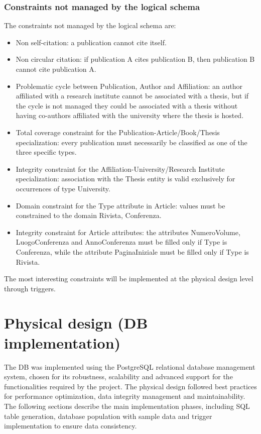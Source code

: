 \documentclass[a4paper,12pt]{article}
\begin{document}
\subsubsection*{Constraints not managed by the logical schema} 
The constraints not managed by the logical schema are:
\begin{itemize}
    \item Non self-citation: a publication cannot cite itself.
    \item Non circular citation: if publication A cites publication B, then publication B cannot cite publication A.
    \item Problematic cycle between Publication, Author and Affiliation: an author affiliated with a research institute cannot be associated with a thesis, but if the cycle is not managed they could be associated with a thesis without having co-authors affiliated with the university where the thesis is hosted.
    \item Total coverage constraint for the Publication-Article/Book/Thesis specialization: every publication must necessarily be classified as one of the three specific types.
    \item Integrity constraint for the Affiliation-University/Research Institute specialization: association with the Thesis entity is valid exclusively for occurrences of type University.
    \item Domain constraint for the Type attribute in Article: values must be constrained to the domain {Rivista, Conferenza}.
    \item Integrity constraint for Article attributes: the attributes NumeroVolume, LuogoConferenza and AnnoConferenza must be filled only if Type is Conferenza, while the attribute PaginaIniziale must be filled only if Type is Rivista.
\end{itemize} 
The most interesting constraints will be implemented at the physical design level through triggers.

\section{Physical design (DB implementation)} \label{sec:progettazione-fisica}
The DB was implemented using the PostgreSQL relational database management system, chosen for its robustness, scalability and advanced support for the functionalities required by the project. The physical design followed best practices for performance optimization, data integrity management and maintainability. The following sections describe the main implementation phases, including SQL table generation, database population with sample data and trigger implementation to ensure data consistency.
\end{document}

